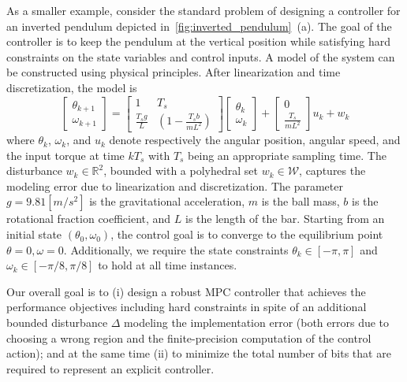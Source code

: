 As a smaller example, consider the standard problem of designing a controller for an inverted pendulum depicted in~\autoref{fig:inverted_pendulum}~{(a)}.
The goal of the controller is to keep the pendulum at the vertical position while satisfying hard constraints on the state variables and control inputs.
A model of the system can be constructed using physical principles. 
After linearization and time discretization, the model is
	\begin{equation}
		\begin{bmatrix}
			 \theta_{k+1}\\
			\omega_{k+1}
		\end{bmatrix}=
		\begin{bmatrix}
			1 & T_s\\
			\frac{T_sg}{L}& (1-\frac{T_sb}{mL^2})		
		\end{bmatrix}
		\begin{bmatrix}
			\theta_k\\
			\omega_k
		\end{bmatrix}+
		\begin{bmatrix}
			0\\
			\frac{T_s}{mL^2}
		\end{bmatrix}u_k + w_k
		\label{eq:pendul_ss}
	\end{equation}
where $\theta_k$, $\omega_k$, and $u_k$ denote respectively the angular position, angular speed, 
and the input torque at time $kT_s$ with $T_s$ being an appropriate sampling time.
The disturbance $w_k\in\mathbb R^2$, bounded with a polyhedral set $w_k\in \mathcal W$, captures the modeling error due to 
linearization and discretization. 
The parameter $g=9.81 [m/s^2]$ is the gravitational acceleration, $m$ is the ball mass, $b$ is the rotational fraction coefficient, 
and $L$ is the length of the bar. 
Starting from an initial state $(\theta_0,\omega_0)$, the control goal is to converge to the equilibrium point 
$\theta=0, \omega=0$.
Additionally, we require the state constraints $\theta_k\in[-\pi,\pi]$ and $\omega_k\in[-\pi/8,\pi/8]$ to hold at all time instances.

Our overall goal is to 
(i) design a robust MPC controller that achieves the performance objectives including hard constraints in spite of an additional bounded
disturbance $\Delta$ modeling the implementation error (both errors due to choosing a wrong region and the finite-precision computation of the control action);
and at the same time
(ii) to minimize the total number of bits that are required to represent an explicit controller.

